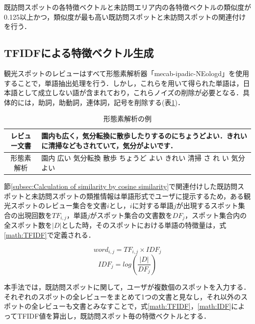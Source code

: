\documentclass{deimj}
\begin{document}
既訪問スポットの各特徴ベクトルと未訪問エリア内の各特徴ベクトルの類似度が0.125以上かつ，類似度が最も高い既訪問スポットと未訪問スポットの関連付けを行う．

\subsection{TFIDFによる特徴ベクトル生成}
\label{subsec:Feature vector generation by TFIDF}
観光スポットのレビューはすべて形態素解析器「mecab-ipadic-NEologd」を使用することで，単語抽出処理を行う．しかし，これらを用いて得られた単語は，日本語として成立しない語が含まれており，これらノイズの削除が必要となる．具体的には，助詞，助動詞，連体詞，記号を削除する(表\ref{table:mecab})．

\begin{table}[t]
  \caption{形態素解析の例}
  \label{table:mecab}
  \centering
    \begin{tabular}{c|p{}} \hline
  レビュー文書 & 園内も広く，気分転換に散歩したりするのにちょうどよい．きれいに清掃などもされていて，気分がよいです．\\\hline
  形態素解析 & 園内 広い 気分転換 散歩 ちょうど よい きれい 清掃 さ れ い 気分 よい  \\\hline
    \end{tabular}
\end{table}

節\ref{subsec:Calculation of similarity by cosine similarity}で関連付けした既訪問スポットと未訪問スポットの類推情報は単語形式でユーザに提示するため，ある観光スポットのレビュー集合を文書$i$とし，$i$に対する単語$j$が出現するスポット集合の出現回数を$TF_{i,j}$，単語$j$がスポット集合の文書数を$DF_{j}$，スポット集合内の全スポット数を$|D|$とした時，そのスポットにおける単語の特徴量は，式\ref{math:TFIDF}で定義される．

\begin{equation}
  word_{i,j} = TF_{i,j} \times IDF_{j}
  \label{math:TFIDF}
\end{equation}
\begin{equation}
  IDF_{j} = log(\frac{|D|}{DF_{j}})
  \label{math:IDF}
\end{equation}

本手法では，既訪問スポットに関して，ユーザが複数個のスポットを入力する．それぞれのスポットの全レビューをまとめて1つの文書と見なし，それ以外のスポットの全レビューも文書とみなすことで，式\ref{math:TFIDF}，\ref{math:IDF}によってTFIDF値を算出し，既訪問スポット毎の特徴ベクトルとする．
\end{document}
